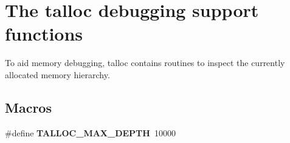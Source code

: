 \hypertarget{group__talloc__debug}{}\section{The talloc debugging support functions}
\label{group__talloc__debug}


To aid memory debugging, talloc contains routines to inspect the currently allocated memory hierarchy.  


\subsection*{Macros}
\begin{DoxyCompactItemize}
\item 
\hypertarget{group__talloc__debug_ga6d768b15869983da2040e3665fef9fdf}{}\#define {\bfseries T\+A\+L\+L\+O\+C\+\_\+\+M\+A\+X\+\_\+\+D\+E\+P\+T\+H}~10000\label{group__talloc__debug_ga6d768b15869983da2040e3665fef9fdf}

\end{DoxyCompactItemize}
